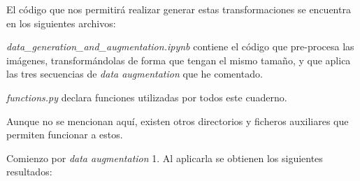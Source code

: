 El código que nos permitirá realizar generar estas transformaciones se encuentra en los siguientes archivos:

\vspace{0.2cm}

\noindent \textit{{data\_generation\_and\_augmentation.ipynb}} contiene el código que pre-procesa las imágenes, transformándolas de forma que tengan el mismo tamaño, y que aplica las tres secuencias de \textit{data augmentation} que he comentado.

\noindent \textit{functions.py} declara funciones utilizadas por todos este cuaderno.

\noindent Aunque no se mencionan aquí, existen otros directorios y ficheros auxiliares que permiten funcionar a estos.

Comienzo por \textit{data augmentation} 1. Al aplicarla se obtienen los siguientes resultados:

